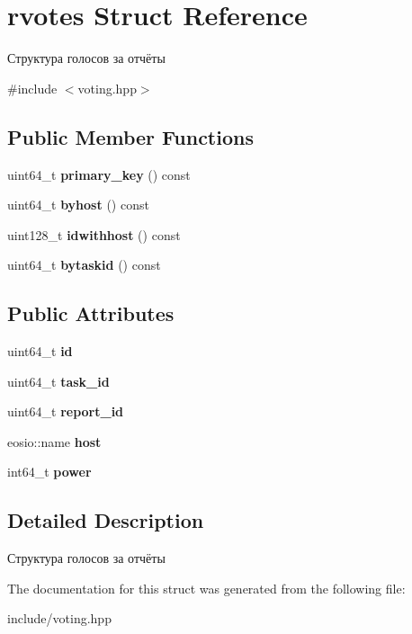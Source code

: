 \hypertarget{structrvotes}{}\section{rvotes Struct Reference}
\label{structrvotes}


Структура голосов за отчёты  




{\ttfamily \#include $<$voting.\+hpp$>$}

\subsection*{Public Member Functions}
\begin{DoxyCompactItemize}
\item 
\mbox{\label{structrvotes_a7b9563ac61083fbdc75bec7c955c6fc5}} 
uint64\+\_\+t {\bfseries primary\+\_\+key} () const
\item 
\mbox{\label{structrvotes_a8c0d5e2570290b890412846556c2a494}} 
uint64\+\_\+t {\bfseries byhost} () const
\item 
\mbox{\label{structrvotes_a31893f25a092c6b9a70919f547b51107}} 
uint128\+\_\+t {\bfseries idwithhost} () const
\item 
\mbox{\label{structrvotes_ac76fa641e0af8e6d2f4664d7df4d6fc1}} 
uint64\+\_\+t {\bfseries bytaskid} () const
\end{DoxyCompactItemize}
\subsection*{Public Attributes}
\begin{DoxyCompactItemize}
\item 
\mbox{\label{structrvotes_a322bf9b1d0e5489d26b6b24a13532722}} 
uint64\+\_\+t {\bfseries id}
\item 
\mbox{\label{structrvotes_a6b175e7d84f8aac98675102b07ae93fe}} 
uint64\+\_\+t {\bfseries task\+\_\+id}
\item 
\mbox{\label{structrvotes_a854dbd32980b0bf64c82bf499a80c2a1}} 
uint64\+\_\+t {\bfseries report\+\_\+id}
\item 
\mbox{\label{structrvotes_af867680150bd09153f10fe2831687b8c}} 
eosio\+::name {\bfseries host}
\item 
\mbox{\label{structrvotes_ad8590180d851272c4712165aa9b30883}} 
int64\+\_\+t {\bfseries power}
\end{DoxyCompactItemize}


\subsection{Detailed Description}
Структура голосов за отчёты 

The documentation for this struct was generated from the following file\+:\begin{DoxyCompactItemize}
\item 
include/voting.\+hpp\end{DoxyCompactItemize}
